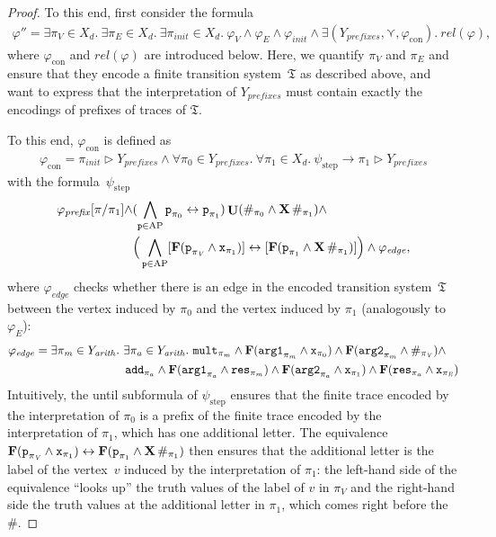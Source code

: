 \documentclass[dvipsnames,10pt,a4paper]{amsart}
\theoremstyle{definition}
\theoremstyle{remark}
\renewcommand{\phi}{\varphi}
\newcommand{\F}{\mathop{\mathbf{F}\vphantom{a}}\nolimits}
\DeclareMathOperator{\U}{\mathbf{U}}
\newcommand{\X}{\mathop{\mathbf{X}\vphantom{a}}\nolimits}
\newcommand{\ap}[0]{\mathrm{AP}}
\newcommand{\unidisvar}{X_d}
\newcommand{\smallest}{\curlyvee}
\newcommand{\myquot}[1]{``#1''}
\newcommand{\tsys}{\mathfrak{T}}
\newcommand{\inprop}{\mathtt{x}}
\newcommand{\proposition}{\texttt{p}}
\newcommand{\argone}{\texttt{arg1}}
\newcommand{\argtwo}{\texttt{arg2}}
\newcommand{\res}{\texttt{res}}
\newcommand{\add}{\texttt{add}}
\newcommand{\mult}{\texttt{mult}}
\newcommand{\arith}{\mathit{arith}}
\newcommand{\con}{\mathrm{con}}
\newcommand{\step}{\mathrm{step}}
\newcommand{\tracein}{\mathrel{\triangleright}}
\newcommand{\vertices}{\mathit{V}}
\newcommand{\edges}{\mathit{E}}
\newcommand{\edge}{\mathit{edge}}
\newcommand{\prefix}{\mathit{prefix}}
\newcommand{\prefixes}{\mathit{prefixes}}
\newcommand{\rel}{\mathit{rel}}
\newcommand{\init}{\mathit{init}}
\begin{document}
\begin{proof}
To this end, first consider the formula
\begin{align*}
\phi'' = \exists \pi_\vertices \in \unidisvar.\ \exists \pi_\edges \in \unidisvar.\ \exists \pi_\init \in \unidisvar.\ \phi_\vertices \wedge \phi_\edges \wedge \phi_\init \wedge \exists (Y_\prefixes,\smallest, \phi_\con).\ \rel(\phi),
\end{align*}
where $\phi_\con$ and $\rel(\phi)$ are introduced below.
Here, we quantify $\pi_\vertices$ and $\pi_\edges$ and ensure that they encode a finite transition system~$\tsys$ as described above, and want to express that the interpretation of $Y_\prefixes$  must contain exactly the encodings of prefixes of traces of $\tsys$. 

To this end, $\phi_\con$ is defined as 
\begin{align*}
	\phi_\con = \pi_\init \tracein Y_\prefixes \wedge \forall \pi_0 \in Y_\prefixes.\ \forall \pi_1 \in \unidisvar.\ 
	\psi_\step \rightarrow \pi_1 \tracein Y_\prefixes
\end{align*}
with the formula~$\psi_\step $
\begin{align*}
\phi_\prefix[\pi/\pi_1] \wedge &
	(\bigwedge_{\proposition \in \ap} \proposition_{\pi_0} \leftrightarrow \proposition_{\pi_1}) \U(\#_{\pi_0} \wedge \X \#_{\pi_1}) \wedge\\
&	\Big(\bigwedge_{\proposition \in \ap} [\F(\proposition_{\pi_\vertices} \wedge \inprop_{\pi_1}) ]\leftrightarrow [\F(\proposition_{\pi_1}  \wedge \X\#_{\pi_1})] \Big) \wedge 
\phi_{\edge},    
\end{align*}
where $\phi_\edge$ checks whether there is an edge in the encoded transition system~$\tsys$ between the vertex induced by $\pi_0$ and the vertex induced by $\pi_1$ (analogously to $\phi_\edges$):
\begin{align*}
\phi_\edge = \exists \pi_m \in Y_\arith.\ \exists \pi_a\in Y_\arith.\
{}&{}
\mult_{\pi_m} \wedge
\F(\argone_{\pi_m} \wedge \inprop_{\pi_0}) \wedge
\F(\argtwo_{\pi_m} \wedge \#_{\pi_\vertices}) \wedge\\
{}&{}\hspace{-2cm}
\add_{\pi_a} \wedge
\F(\argone_{\pi_a} \wedge \res_{\pi_m} ) \wedge
\F(\argtwo_{\pi_a} \wedge \inprop_{\pi_1}) \wedge
\F(\res_{\pi_a} \wedge \inprop_{\pi_\edges})
\end{align*}
Intuitively, the until subformula of $\psi_\step$ ensures that the finite trace encoded by the interpretation of $\pi_0$ is a prefix of the finite trace encoded by the interpretation of $\pi_1$, which has one additional letter.
The equivalence~$\F(\proposition_{\pi_\vertices} \wedge \inprop_{\pi_1}) \leftrightarrow \F(\proposition_{\pi_1}  \wedge \X\#_{\pi_1})$ then ensures that the additional letter is the label of the vertex~$v$ induced by the interpretation of $\pi_1$: the left-hand side of the equivalence \myquot{looks up} the truth values of the label of $v$ in $\pi_\vertices$ and the right-hand side the truth values at the additional letter in $\pi_1$, which comes right before the $\#$.


\end{proof}
\end{document}
